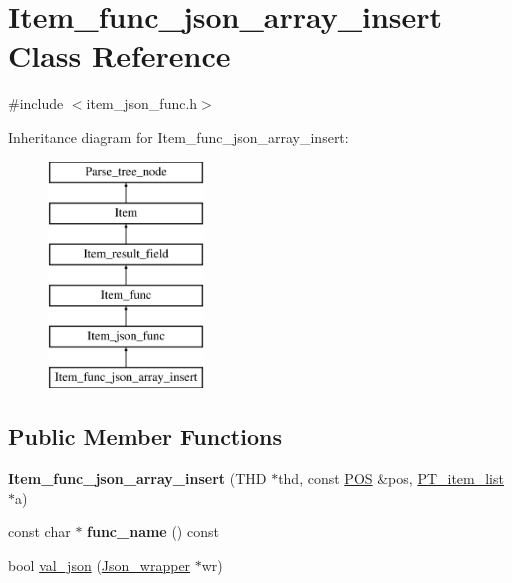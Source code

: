 \hypertarget{classItem__func__json__array__insert}{}\section{Item\+\_\+func\+\_\+json\+\_\+array\+\_\+insert Class Reference}
\label{classItem__func__json__array__insert}


{\ttfamily \#include $<$item\+\_\+json\+\_\+func.\+h$>$}

Inheritance diagram for Item\+\_\+func\+\_\+json\+\_\+array\+\_\+insert\+:\begin{figure}[H]
\begin{center}
\leavevmode
\includegraphics[height=6.000000cm]{classItem__func__json__array__insert}
\end{center}
\end{figure}
\subsection*{Public Member Functions}
\begin{DoxyCompactItemize}
\item 
\mbox{\label{classItem__func__json__array__insert_a038bd3e84f367550baa723abdc58f0c4}} 
{\bfseries Item\+\_\+func\+\_\+json\+\_\+array\+\_\+insert} (T\+HD $\ast$thd, const \mbox{\hyperlink{structYYLTYPE}{P\+OS}} \&pos, \mbox{\hyperlink{classPT__item__list}{P\+T\+\_\+item\+\_\+list}} $\ast$a)
\item 
\mbox{\label{classItem__func__json__array__insert_a8638acf4b5f8fea63d94c72ebff17429}} 
const char $\ast$ {\bfseries func\+\_\+name} () const
\item 
bool \mbox{\hyperlink{classItem__func__json__array__insert_a967c286607ca60e2e3b7e2771eab26d0}{val\+\_\+json}} (\mbox{\hyperlink{classJson__wrapper}{Json\+\_\+wrapper}} $\ast$wr)
\end{DoxyCompactItemize}
